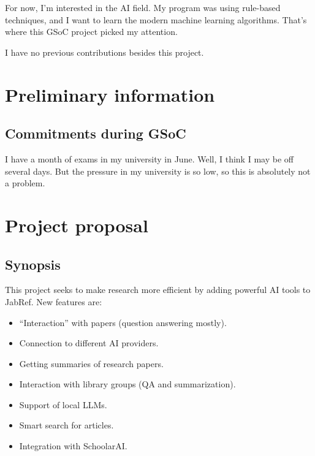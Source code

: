 \documentclass{article}
\begin{document}
	For now, I'm interested in the AI field. My program was using rule-based techniques, and I want to learn the modern machine learning algorithms. That's where this GSoC project picked my attention.
	
	I have no previous contributions besides this project.
	
	\section{Preliminary information}
	
	\subsection{Commitments during GSoC}
	I have a month of exams in my university in June. Well, I think I may be off several days. But the pressure in my university is so low, so this is absolutely not a problem.
	
	\section{Project proposal}
	
	\subsection{Synopsis}
	This project seeks to make research more efficient by adding powerful AI tools to JabRef. New features are:
	\begin{itemize}
		\item \enquote{Interaction} with papers (question answering mostly).
		\item Connection to different AI providers.
		\item Getting summaries of research papers.
		\item Interaction with library groups (QA and summarization).
		\item Support of local LLMs.
		\item Smart search for articles.
		\item Integration with SchoolarAI.
	\end{itemize}	
	
\end{document}
